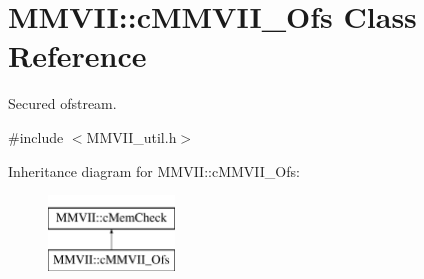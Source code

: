 \hypertarget{classMMVII_1_1cMMVII__Ofs}{}\section{M\+M\+V\+II\+:\+:c\+M\+M\+V\+I\+I\+\_\+\+Ofs Class Reference}
\label{classMMVII_1_1cMMVII__Ofs}


Secured ofstream.  




{\ttfamily \#include $<$M\+M\+V\+I\+I\+\_\+util.\+h$>$}

Inheritance diagram for M\+M\+V\+II\+:\+:c\+M\+M\+V\+I\+I\+\_\+\+Ofs\+:\begin{figure}[H]
\begin{center}
\leavevmode
\includegraphics[height=2.000000cm]{classMMVII_1_1cMMVII__Ofs}
\end{center}
\end{figure}
